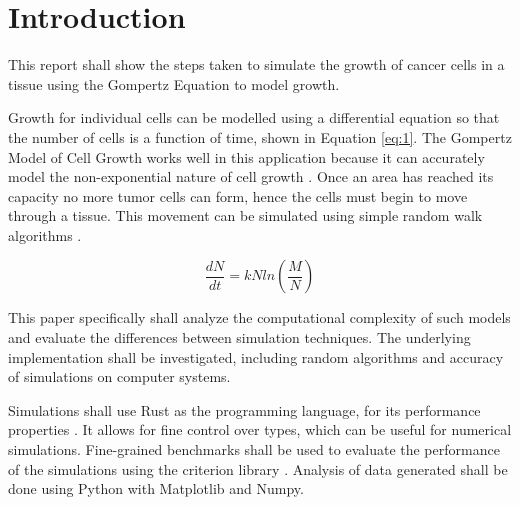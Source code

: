 \chapter{Introduction}

This report shall show the steps taken to simulate the growth of cancer cells in a tissue using the Gompertz Equation to model growth.

Growth for individual cells can be modelled using a differential equation so that the number of cells is a function of time, shown in Equation \ref{eq:1}.
The Gompertz Model of Cell Growth works well in this application because it can accurately model the non-exponential nature of cell growth \autocite{tatroMathematicsCancerFitting2018}.
Once an area has reached its capacity no more tumor cells can form, hence the cells must begin to move through a tissue.
This movement can be simulated using simple random walk algorithms \autocite{codlingRandomWalkModels2008}.

\begin{equation}
    \frac{dN}{dt} = kNln\left(\frac{M}{N} \right) \label{eq:1}
\end{equation}

This paper specifically shall analyze the computational complexity of such models and evaluate the differences between simulation techniques.
The underlying implementation shall be investigated, including random algorithms and accuracy of simulations on computer systems.

Simulations shall use Rust as the programming language, for its performance properties \autocite{adamRustConciseOverview2023}.
It allows for fine control over types, which can be useful for numerical simulations.
Fine-grained benchmarks shall be used to evaluate the performance of the simulations using the criterion library \autocite{heislerBheislerCriterionRs2024}.
Analysis of data generated shall be done using Python with Matplotlib and Numpy.